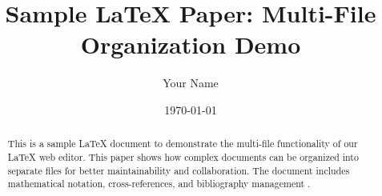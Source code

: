 \documentclass{article}
\title{Sample LaTeX Paper: Multi-File Organization Demo}
\author{Your Name}
\date{\today}
\begin{document}
\maketitle

\begin{abstract}
This is a sample LaTeX document to demonstrate the multi-file functionality of our LaTeX web editor. This paper shows how complex documents can be organized into separate files for better maintainability and collaboration. The document includes mathematical notation, cross-references, and bibliography management \cite{lamport1994latex}.
\end{abstract}










\end{document}
